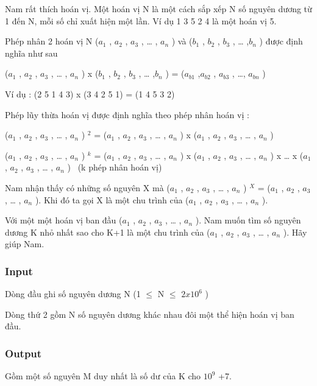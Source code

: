 

Nam rất thích hoán vị. Một hoán vị N là một cách sắp xếp N số nguyên dương từ 1 đến N, mỗi số chỉ xuất hiện một lần. Ví dụ 1 3 5 2 4 là một hoán vị 5.

Phép nhân 2 hoán vị N ($a_{1}$ , $a_{2}$ , $a_{3}$ , … , $a_{n}$ ) và ($b_{1}$ , $b_{2}$ , $b_{3}$ , … ,$b_{n}$ ) được định nghĩa như sau


($a_{1}$ , $a_{2}$ , $a_{3}$ , … , $a_{n}$ ) x ($b_{1}$ , $b_{2}$ , $b_{3}$ , … ,$b_{n}$ ) = ($a_{b1}$ ,$a_{b2}$ , $a_{b3}$ , …, $a_{bn}$ )


Ví dụ : (2 5 1 4 3) x (3 4 2 5 1) = (1 4 5 3 2)

Phép lũy thừa hoán vị được định nghĩa theo phép nhân hoán vị :


($a_{1}$ , $a_{2}$ , $a_{3}$ , … , $a_{n}$ ) $^ 2 $ = ($a_{1}$ , $a_{2}$ , $a_{3}$ , … , $a_{n}$ ) x ($a_{1}$ , $a_{2}$ , $a_{3}$ , … , $a_{n}$ )


($a_{1}$ , $a_{2}$ , $a_{3}$ , … , $a_{n}$ ) $^ k $ = ($a_{1}$ , $a_{2}$ , $a_{3}$ , … , $a_{n}$ ) x ($a_{1}$ , $a_{2}$ , $a_{3}$ , … , $a_{n}$ ) x … x ($a_{1}$ , $a_{2}$ , $a_{3}$ , … , $a_{n}$ )  (k phép nhân hoán vị)





Nam nhận thấy có những số nguyên X mà ($a_{1}$ , $a_{2}$ , $a_{3}$ , … , $a_{n}$ ) $^ X $ = ($a_{1}$ , $a_{2}$ , $a_{3}$ , … , $a_{n}$ ). Khi đó ta gọi X là một chu trình của ($a_{1}$ , $a_{2}$ , $a_{3}$ , … , $a_{n}$ ).


Với một một hoán vị ban đầu ($a_{1}$ , $a_{2}$ , $a_{3}$ , … , $a_{n}$ ). Nam muốn tìm số nguyên dương K nhỏ nhất sao cho K+1 là một chu trình của ($a_{1}$ , $a_{2}$ , $a_{3}$ , … , $a_{n}$ ). Hãy giúp Nam.

\subsubsection{Input}

Dòng đầu ghi số nguyên dương N (1  $\le$  N  $\le$  $2x10^{6}$ )


Dòng thứ 2 gồm N số nguyên dương khác nhau đôi một thể hiện hoán vị ban đầu.

\subsubsection{Output}

Gồm một số nguyên M duy nhất là số dư của K cho $10^{9}$ +7.


